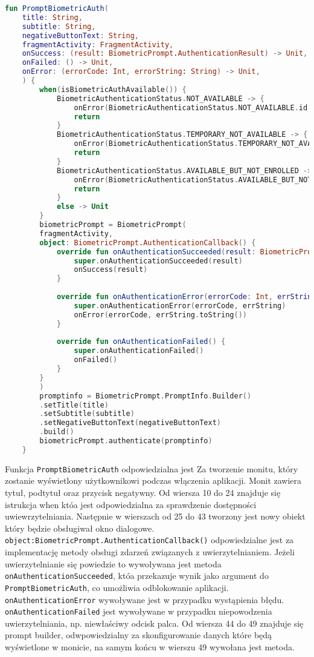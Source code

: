 \begin{lstlisting}[caption=Sprawdzenie monitu biometrycznego, label={lst:Fingerprint-checkmonit}, language=kotlin]
	fun PromptBiometricAuth(
	title: String,
	subtitle: String,
	negativeButtonText: String,
	fragmentActivity: FragmentActivity,
	onSuccess: (result: BiometricPrompt.AuthenticationResult) -> Unit,
	onFailed: () -> Unit,
	onError: (errorCode: Int, errorString: String) -> Unit,
	) {
		when(isBiometricAuthAvailable()) {
			BiometricAuthenticationStatus.NOT_AVAILABLE -> {
				onError(BiometricAuthenticationStatus.NOT_AVAILABLE.id,"Not available on this device")
				return
			}
			BiometricAuthenticationStatus.TEMPORARY_NOT_AVAILABLE -> {
				onError(BiometricAuthenticationStatus.TEMPORARY_NOT_AVAILABLE.id, "Not available at this moment")
				return
			}
			BiometricAuthenticationStatus.AVAILABLE_BUT_NOT_ENROLLED -> {
				onError(BiometricAuthenticationStatus.AVAILABLE_BUT_NOT_ENROLLED.id, "Add a fingerprint")
				return
			}
			else -> Unit
		}
		biometricPrompt = BiometricPrompt(
		fragmentActivity,
		object: BiometricPrompt.AuthenticationCallback() {
			override fun onAuthenticationSucceeded(result: BiometricPrompt.AuthenticationResult) {
				super.onAuthenticationSucceeded(result)
				onSuccess(result)
			}
			
			override fun onAuthenticationError(errorCode: Int, errString: CharSequence) {
				super.onAuthenticationError(errorCode, errString)
				onError(errorCode, errString.toString())
			}
			
			override fun onAuthenticationFailed() {
				super.onAuthenticationFailed()
				onFailed()
			}
		}
		)
		promptinfo = BiometricPrompt.PromptInfo.Builder()
		.setTitle(title)
		.setSubtitle(subtitle)
		.setNegativeButtonText(negativeButtonText)
		.build()
		biometricPrompt.authenticate(promptinfo)
	}
\end{lstlisting}
Funkcja \texttt{PromptBiometricAuth} odpowiedzialna jest Za tworzenie monitu, który zostanie wyświetlony użytkownikowi podczas włączenia aplikacji. Monit zawiera tytuł, podtytuł oraz przycisk negatywny. Od wiersza 10 do 24 znajduje się istrukcja when któa jest odpowiedzialna za sprawdzenie dostępności uwiewrzytelniania. Następnie w wierszach od 25 do 43 tworzony jest nowy obiekt który będzie obsługiwał okno dialogowe. \texttt{object:BiometricPrompt.AuthenticationCallback()} odpowiedzialne jest za implementację metody obsługi zdarzeń związanych z uwierzytelnianiem. Jeżeli uwierzytelnianie się powiedzie to wywoływana jest metoda \texttt{onAuthenticationSucceeded}, któa przekazuje wynik jako argument do \texttt{PromptBiometricAuth}, co umożliwia odblokowanie aplikacji. \texttt{onAuthenticationError} wywoływane jest w przypadku wystąpienia błędu. \texttt{onAuthenticationFailed} jest wywoływane w przypadku niepowodzenia uwierzytelniania, np. niewłaściwy odcisk palca.
Od wiersza 44 do 49 znajduje się prompt builder, odwpowiedzialny za skonfigurowanie danych które będą wyświetlone w monicie, na samym końcu w wierszu 49 wywołana jest metoda.

